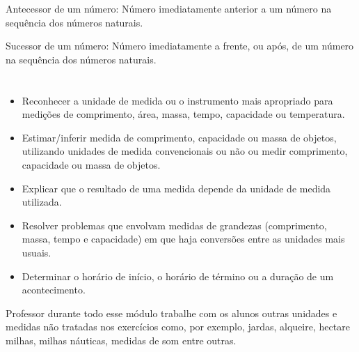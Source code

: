 \begin{escolha}
Antecessor de um número: Número imediatamente anterior a um número na
sequência dos números naturais.

Sucessor de um número: Número imediatamente a frente, ou após, de um
número na sequência dos números naturais.

\chapter{}



\begin{itemize}
    \item Reconhecer a unidade de medida ou o instrumento mais apropriado para
medições de comprimento, área, massa, tempo, capacidade ou temperatura.

    \item Estimar/inferir medida de comprimento, capacidade ou massa de objetos,
utilizando unidades de medida convencionais ou não ou medir comprimento,
capacidade ou massa de objetos.

    \item Explicar que o resultado de uma medida depende da unidade de medida
utilizada.

    \item Resolver problemas que envolvam medidas de grandezas (comprimento,
massa, tempo e capacidade) em que haja conversões entre as unidades mais
usuais.

    \item Determinar o horário de início, o horário de término ou a duração de
um acontecimento.
\end{itemize}

Professor durante todo esse módulo trabalhe com os alunos outras
unidades e medidas não tratadas nos exercícios como, por exemplo,
jardas, alqueire, hectare milhas, milhas náuticas, medidas de som entre
outras.

\end{escolha}
